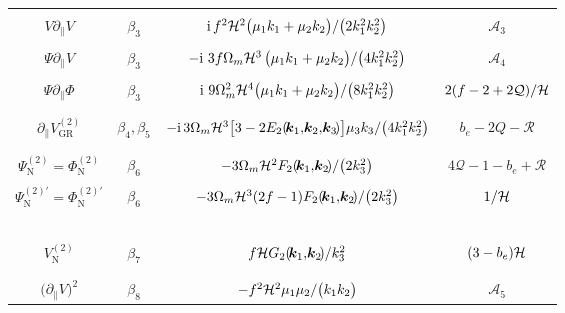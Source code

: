 \begin{landscape}
\begin{longtable}{| c | c | c | c |}
&  &  & \\
\hline 
&  &  & \\
$V\partial_{\parallel}V $ & $\beta_{3}$ & $ \mathrm{i}\,f^{2}\mathcal{H}^{2}
{\big(\mu_{1}k_{1} + \mu_{2}k_{2}\big)}/{\big(2k_{1}^{2}k_{2}^{2}\big)}$ &  $\mathcal{A}_{3}$ \\ 
&  &  & \\
$\Psi\partial_{\parallel}V$ & $\beta_{3}$ & $-{\mathrm{i\,}}\,3f\Omega_{m}\mathcal{H}^{3}\,{\big(\mu_{1}k_{1} + \mu_{2}k_{2}\big)}/{\big(4k_{1}^{2}k_{2}^{2}\big)}$ & $\mathcal{A}_{4}$ \\ 
&  &  & \\
$\Psi\partial_{\parallel}\Phi$ & $\beta_{3}$ & ${\mathrm{i\,}}\,9\Omega_{m}^{2}\mathcal{H}^{4}{\big(\mu_{1}k_{1} + \mu_{2}k_{2}\big)}/{\big(8k_{1}^{2}k_{2}^{2}\big)}$ & ${2}(f-2+2\mathcal{Q})/{\mathcal{H}}$  \\ 
&  &  & \\
\hline
&  &  & \\ 
${\partial_{\parallel}V^{(2)}_{\mathrm{GR}}}$ & $\beta_{4},\beta_{5}$ & $-\mathrm{i}\,3\Omega_{m}\mathcal{H}^{3}\big[3 -2 E_{2}(\!\bm{k}_{1},\!\bm{k}_{2},\!\bm{k}_{3}\!)\big]\mu_3 k_3/\big(4k_{1}^{2}k_{2}^{2}\big)$ & $b_{e}-2Q-\mathcal{R}$ \\
&  &  & \\
\hline
&  &  & \\ 
${\Psi^{(2)}_{\mathrm{N}}=\Phi^{(2)}_{\mathrm{N}}}$ & $\beta_{6}$ & $-{3}\Omega_{m}{\mathcal{H}^{2}}F_{2}(\!\bm{k}_{1},\!\bm{k}_{2}\!)/{\big(2k_{3}^{2}\big)}$ & $4\mathcal{Q}-1-b_{e}+\mathcal{R}$ \\
&  &  & \\ 
${\Psi_{\mathrm{N}}^{(2)\prime} = \Phi_{\mathrm{N}}^{(2)\prime}}$  & $\beta_{6}$ & $-{3}\Omega_{m}{\mathcal{H}^{3}}(2f-1)F_{2}(\!\bm{k}_{1},\!\bm{k}_{2}\!)/{\big(2k_{3}^{2}\big)}$ & ${1}/{\mathcal{H}}$ \\
&  &  & \\ 
\hline\
&  &  & \\ 
$V^{(2)}_{\mathrm{N}}$ & $\beta_{7}$ & $f{\mathcal{H}}G_{2}(\!\bm{k}_{1},\!\bm{k}_{2}\!)/{k_{3}^{2}}$ & $(3-b_{e})\mathcal{H}$ \\ 
&  &  & \\
\hline 
&  &  & \\
$\big(\partial_{\parallel}V\big)^{2} $ & $\beta_{8}$ & $-f^{2}\mathcal{H}^{2}{\mu_{1}\mu_{2}}/{\big(k_{1}k_{2}\big)}$ & $\mathcal{A}_{5}$ \\

\end{longtable}
\end{landscape}
